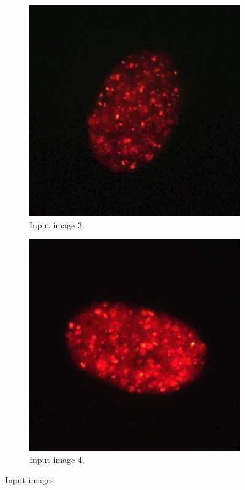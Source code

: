 \documentclass[a4paper,11pt]{ijamas}
\begin{document}
\begin{figure}[!h]
\begin{subfigure}{.48\textwidth}
  \centering
  \includegraphics[width=0.80\columnwidth]{./figs/_4colr.jpg}
 \caption{Input image 3. \cite{cil:13903}}
  \label{fig:inputimage3}
\end{subfigure}%
\begin{subfigure}{.48\textwidth}
  \centering
  \includegraphics[width=0.80\columnwidth]{./figs/_5colr.jpg}
 \caption{Input image 4. \cite{cil:13904}}
  \label{fig:inputimage4}
\end{subfigure}%
\caption{Input images}
\label{fig:inputimages}
\end{figure}
\end{document}
